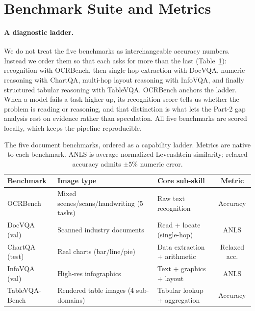\documentclass{article}
\begin{document}
\section{Benchmark Suite and Metrics}
\label{sec:bench}

\paragraph{A diagnostic ladder.}
We do not treat the five benchmarks as interchangeable accuracy numbers. Instead
we order them so that each asks for more than the last
(Table~\ref{tab:benchmarks}): recognition with OCRBench, then single-hop
extraction with DocVQA, numeric reasoning with ChartQA, multi-hop layout
reasoning with InfoVQA, and finally structured tabular reasoning with TableVQA.
OCRBench anchors the ladder. When a model fails a task higher up, its recognition
score tells us whether the problem is reading or reasoning, and that distinction
is what lets the Part-2 gap analysis rest on evidence rather than speculation.
All five benchmarks are scored locally, which keeps the pipeline reproducible.

\begin{table}[t]
\caption{The five document benchmarks, ordered as a capability ladder. Metrics
are native to each benchmark. ANLS is average normalized Levenshtein
similarity; relaxed accuracy admits $\pm5\%$ numeric error.}
\label{tab:benchmarks}
\centering
\small
\begin{tabular}{@{}lllc@{}}
\toprule
Benchmark & Image type & Core sub-skill & Metric \\
\midrule
OCRBench           & Mixed scenes/scans/handwriting (5 tasks) & Raw text recognition          & Accuracy \\
DocVQA (val)       & Scanned industry documents               & Read + locate (single-hop)    & ANLS \\
ChartQA (test)     & Real charts (bar/line/pie)               & Data extraction + arithmetic  & Relaxed acc. \\
InfoVQA (val)      & High-res infographics                    & Text + graphics + layout      & ANLS \\
TableVQA-Bench     & Rendered table images (4 sub-domains)    & Tabular lookup + aggregation  & Accuracy \\
\bottomrule
\end{tabular}
\end{table}
\end{document}
